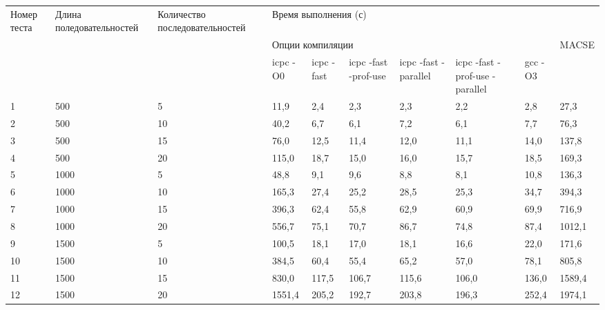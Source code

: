 \begin{landscape}
\begin{table}[htbp]
\small
\caption{Результаты тестирования}
\begin{flushright}
\begin{longtable}{|p{1cm}|*{2}{p{3cm}|}*{2}{p{1.8cm}|}*{3}{p{2.8cm}|}*{2}{p{1.8cm}|}}
\hline
\multicolumn{ 1}{|p{1cm}|}{Номер теста} & \multicolumn{ 1}{p{3cm}|}{Длина поледовательностей} & \multicolumn{ 1}{p{3cm}|}{Количество последовательностей} & \multicolumn{ 7}{p{15.6cm}|}{Время выполнения (с)} \\ \cline{ 4- 10}
\multicolumn{ 1}{|p{1cm}|}{} & \multicolumn{ 1}{p{3cm}|}{} & \multicolumn{ 1}{p{3cm}|}{} & \multicolumn{ 6}{p{10.8cm}|}{Опции компиляции } & \multicolumn{ 1}{p{1.8cm}|}{MACSE} \\ \cline{ 4- 9}
\multicolumn{ 1}{|p{1cm}|}{} & \multicolumn{ 1}{|p{3cm}|}{} & \multicolumn{ 1}{p{3cm}|}{} & \multicolumn{1}{p{1.8cm}|}{icpc -O0} & \multicolumn{ 1}{p{1.8cm}|}{icpc -fast} & \multicolumn{1}{p{1.8cm}|}{icpc  -fast -prof-use} & \multicolumn{1}{p{1.8cm}|}{icpc -fast -parallel} & \multicolumn{ 1}{p{1.8cm}|}{icpc -fast -prof-use -parallel} & \multicolumn{1}{p{1.8cm}|}{gcc -O3} & \multicolumn{ 1}{p{1.8cm}|}{} \\ 
\hline
1 & 500 & 5 & 11,9 & 2,4 & 2,3 & 2,3 & 2,2 & 2,8 & 27,3 \\ \hline
2 & 500 & 10 & 40,2 & 6,7 & 6,1 & 7,2 & 6,1 & 7,7 & 76,3 \\ \hline
3 & 500 & 15 & 76,0 & 12,5 & 11,4 & 12,0 & 11,1 & 14,0 & 137,8 \\ \hline
4 & 500 & 20 & 115,0 & 18,7 & 15,0 & 16,0 & 15,7 & 18,5 & 169,3 \\ \hline
5 & 1000 & 5 & 48,8 & 9,1 & 9,6 & 8,8 & 8,1 & 10,8 & 136,3 \\ \hline
6 & 1000 & 10 & 165,3 & 27,4 & 25,2 & 28,5 & 25,3 & 34,7 & 394,3 \\ \hline
7 & 1000 & 15 & 396,3 & 62,4 & 55,8 & 62,9 & 60,9 & 69,9 & 716,9 \\ \hline
8 & 1000 & 20 & 556,7 & 75,1 & 70,7 & 86,7 & 74,8 & 87,4 & 1012,1 \\ \hline
9 & 1500 & 5 & 100,5 & 18,1 & 17,0 & 18,1 & 16,6 & 22,0 & 171,6 \\ \hline
10 & 1500 & 10 & 384,5 & 60,4 & 55,4 & 65,2 & 57,0 & 78,1 & 805,8 \\ \hline
11 & 1500 & 15 & 830,0 & 117,5 & 106,7 & 115,6 & 106,0 & 136,0 & 1589,4 \\ \hline
12 & 1500 & 20 & 1551,4 & 205,2 & 192,7 & 203,8 & 196,3 & 252,4 & 1974,1 \\ \hline

\end{longtable}
\end{flushright}
\end{table}
\end{landscape}
